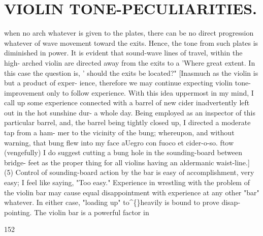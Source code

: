 \documentclass{article}
\begin{document}
\section*{VIOLIN TONE-PECULIARITIES.}
when no arch whatever is given to the plates, there can be no direct progression whatever of wave movement toward the exits. Hence, the tone from such plates is diminished in power. It is evident that sound-wave lines of travel, within the high- arched violin are directed away from the exits to a 'Where great extent. In this case the question is, ' should the exits be located?" [Inasmuch as the violin is but a product of exper- ience, therefore we may continue expecting violin tone-improvement only to follow experience. With this idea uppermost in my mind, I call up some experience connected with a barrel of new cider inadvertently left out in the hot sunshine dur- a whole day. Being employed as an inspector of this particular barrel, and, the barrel being tightly closed up, I directed a moderate tap from a ham- mer to the vicinity of the bung; whereupon, and without warning, that bung flew into my face aUegro con fuoco et cider-o-so. ftow (vengefully) I do suggest cutting a bung hole in the sounding-board between bridge- feet as the proper thing for all violins having an aldermanic waist-line.] (5) Control of sounding-board action by the bar is easy of accomplishment, very easy; I feel like saying, "Too easy." Experience in wrestling with the problem of the violin bar may cause equal disappointment with experience at any other "bar" whatever. In either case, "loading up" to\textasciicircum\{\}heavily is bound to prove disap- pointing. The violin bar is a powerful factor in

152
\end{document}
